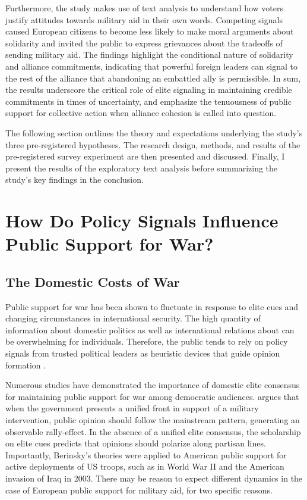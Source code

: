Furthermore, the study makes use of text analysis to understand how voters justify attitudes towards military aid in their own words. Competing signals caused European citizens to become less likely to make moral arguments about solidarity and invited the public to express grievances about the tradeoffs of sending military aid. The findings highlight the conditional nature of solidarity and alliance commitments, indicating that powerful foreign leaders can signal to the rest of the alliance that abandoning an embattled ally is permissible. In sum, the results underscore the critical role of elite signaling in maintaining credible commitments in times of uncertainty, and emphasize the tenuousness of public support for collective action when alliance cohesion is called into question.

The following section outlines the theory and expectations underlying the study's three pre-registered hypotheses. The research design, methods, and results of the pre-registered survey experiment are then presented and discussed. Finally, I present the results of the exploratory text analysis before summarizing the study's key findings in the conclusion.

\section{How Do Policy Signals Influence Public Support for War?}
\subsection{The Domestic Costs of War}
Public support for war has been shown to fluctuate in response to elite cues and changing circumstances in international security. \autocite{chu_commanding_2021, alley_elite_2023, jentleson_still_1998, gelpi_performing_2010, gelpi_success_2005, jakob_barrett_how_2026} The high quantity of information about domestic politics as well as international relations about can be overwhelming for individuals. Therefore, the public tends to rely on policy signals from trusted political leaders as heuristic devices that guide opinion formation \autocite{mondak_public_1993, zaller_nature_2006, berinsky_assuming_2007, baum_relationships_2008}. 

Numerous studies have demonstrated the importance of domestic elite consensus for maintaining public support for war among democratic audiences. \autocite{berinsky_assuming_2007, groeling_crossing_2008, baum_relationships_2008, baum_shot_2009} \textcite{berinsky_assuming_2007} argues that when the government presents a unified front in support of a military intervention, public opinion should follow the mainstream pattern, generating an observable rally-effect. In the absence of a unified elite consensus, the scholarship on elite cues predicts that opinions should polarize along partisan lines. \autocite{berinsky_assuming_2007, druckman_how_2013}  Importantly, Berinsky's theories were applied to American public support for active deployments of US troops, such as in World War II and the American invasion of Iraq in 2003. There may be reason to expect different dynamics in the case of European public support for military aid, for two specific reasons. 

